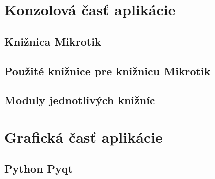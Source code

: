 \chapter{Konzolová časť aplikácie}
\section{Knižnica Mikrotik}
\section{Použité knižnice pre knižnicu Mikrotik}
\section{Moduly jednotlivých knižníc}
\chapter{Grafická časť aplikácie}
\section{Python Pyqt}
